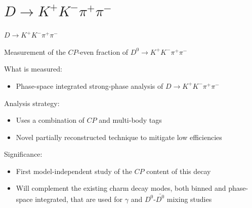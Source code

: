 \documentclass{beamer}
\begin{document}
\section{\texorpdfstring{$D\to K^+K^-\pi^+\pi^-$}{D2KKpipi}}
\begin{frame}{$D\to K^+K^-\pi^+\pi^-$}
\begin{tcolorbox}[enhanced,frame style image=blueshade_cropped.png,
  opacityback=0.75,opacitybacktitle=0.25,
  colback=blue!5!white,colframe=blue!75!black,
  title=\color{white}{\href{https://journals.aps.org/prd/abstract/10.1103/PhysRevD.107.032009}{\color{white}{Phys. Rev. D \textbf{107} 032009}}}]
  {\Large Measurement of the $C\!P$-even fraction of $D^0\to K^+K^-\pi^+\pi^-$}
\end{tcolorbox}
  What is measured:
  \begin{itemize}
    \item{Phase-space integrated strong-phase analysis of $D\to K^+K^-\pi^+\pi^-$}
  \end{itemize}
  Analysis strategy:
  \begin{itemize}
    \item{Uses a combination of $C\!P$ and multi-body tags}
    \item{Novel partially reconstructed technique to mitigate low efficiencies}
  \end{itemize}
  Significance:
  \begin{itemize}
    \item{First model-independent study of the $C\!P$ content of this decay}
    \item{Will complement the existing charm decay modes, both binned and phase-space integrated, that are used for $\gamma$ and $D^0$-$\bar{D^0}$ mixing studies}
  \end{itemize}
\end{frame}
\end{document}
